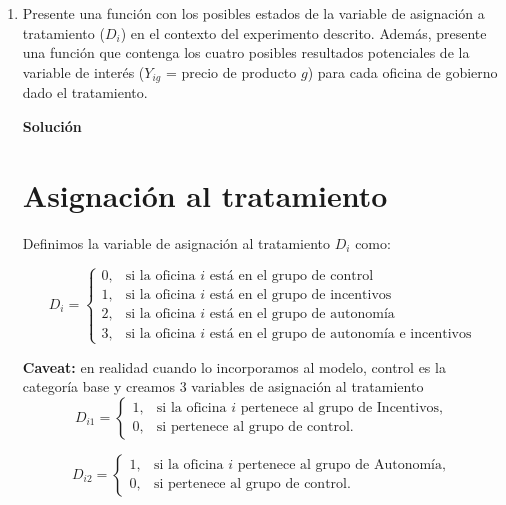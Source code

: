 \documentclass[a4paper, answers, addpoints, 11pt]{exam}
\newenvironment{solucion}{%
  \begin{mdframed}[
    backgroundcolor=blue!5,    %
    linecolor=blue!50,          %
    linewidth=2pt,              %
    leftmargin=10pt,            %
    rightmargin=8pt,           %
    topline=true,              %
    bottomline=true,            %
    roundcorner=10pt,           %
    innerleftmargin=10pt,       %
    innerrightmargin=10pt,      %
    innerbottommargin=10pt,     %
    innertopmargin=10pt         %
  ]%
  \begin{tcolorbox}[colframe=blue!50!black, colback=blue!50, coltitle=white, sharp corners=all, boxrule=1mm, width=\textwidth, halign=left, valign=center, top=0mm, bottom=0mm, left=0mm, right=0mm] \textbf{Solución} \end{tcolorbox} }{\end{mdframed}}
\begin{document}
\begin{enumerate}
  
    \item Presente una función con los posibles estados de la variable de asignación a tratamiento ($D_i$) en el contexto del experimento descrito. Además, presente una función que contenga los cuatro posibles resultados potenciales de la variable de interés ($Y_{ig}$ = precio de producto $g$) para cada oficina de gobierno dado el tratamiento. 

      
  \begin{solucion}
        \section*{Asignación al tratamiento}  
    Definimos la variable de asignación al tratamiento $D_i$ como:

\begin{equation*}
    D_i = \begin{cases}
        0, & \text{si la oficina $i$ está en el grupo de control} \\
        1, & \text{si la oficina $i$ está en el grupo de incentivos} \\
        2, & \text{si la oficina $i$ está en el grupo de autonomía} \\
        3, & \text{si la oficina $i$ está en el grupo de autonomía e incentivos}
    \end{cases}
\end{equation*}

\begin{mdframed}[backgroundcolor=moraditoClaro]
    
\textbf{Caveat:} en realidad cuando lo incorporamos al modelo, control es la categoría base y creamos 3 variables de asignación al tratamiento
\begin{equation*}
D_{i1} =
\begin{cases}
    1, & \text{si la oficina } i \text{ pertenece al grupo de Incentivos}, \\
    0, & \text{si pertenece al grupo de control}.
\end{cases}
\end{equation*}

\begin{equation*}
D_{i2} =
\begin{cases}
    1, & \text{si la oficina } i \text{ pertenece al grupo de Autonomía}, \\
    0, & \text{si pertenece al grupo de control}.
\end{cases}
\end{equation*}


\end{mdframed}
\end{solucion}
\end{enumerate}
\end{document}
